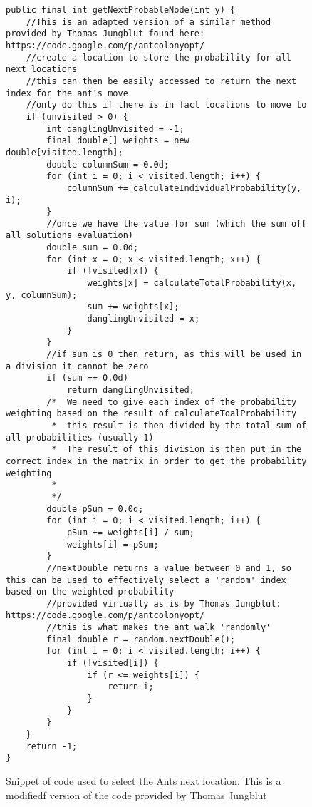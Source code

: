 \begin{figure}[H]
\begin{lstlisting}
public final int getNextProbableNode(int y) {
	//This is an adapted version of a similar method provided by Thomas Jungblut found here: https://code.google.com/p/antcolonyopt/
	//create a location to store the probability for all next locations
	//this can then be easily accessed to return the next index for the ant's move
	//only do this if there is in fact locations to move to
	if (unvisited > 0) {
		int danglingUnvisited = -1;
		final double[] weights = new double[visited.length];
		double columnSum = 0.0d;
		for (int i = 0; i < visited.length; i++) {
			columnSum += calculateIndividualProbability(y, i);
		}
		//once we have the value for sum (which the sum off all solutions evaluation)
		double sum = 0.0d;
		for (int x = 0; x < visited.length; x++) {
			if (!visited[x]) {
				weights[x] = calculateTotalProbability(x, y, columnSum);
				sum += weights[x];
				danglingUnvisited = x;
			}
		}
		//if sum is 0 then return, as this will be used in a division it cannot be zero
		if (sum == 0.0d)
			return danglingUnvisited;
		/*  We need to give each index of the probability weighting based on the result of calculateToalProbability
		 *  this result is then divided by the total sum of all probabilities (usually 1)
		 *  The result of this division is then put in the correct index in the matrix in order to get the probability weighting
		 *
		 */
		double pSum = 0.0d;
		for (int i = 0; i < visited.length; i++) {
			pSum += weights[i] / sum;
			weights[i] = pSum;
		}
		//nextDouble returns a value between 0 and 1, so this can be used to effectively select a 'random' index based on the weighted probability
		//provided virtually as is by Thomas Jungblut: https://code.google.com/p/antcolonyopt/
		//this is what makes the ant walk 'randomly'
		final double r = random.nextDouble();
		for (int i = 0; i < visited.length; i++) {
			if (!visited[i]) {
				if (r <= weights[i]) {
					return i;
				}
			}
		}
	}
	return -1;
}
\end{lstlisting}
\caption[Next Probable Node Code]{Snippet of code used to select the Ants next location. This is a modifiedf version of the code provided by Thomas Jungblut \cite{tjung:aco:blog}}
\label{nextNodeCode}
\end{figure}

